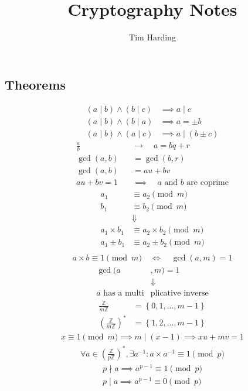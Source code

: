 \documentclass{article}
\title{Cryptography Notes}
\author{Tim Harding}
\newcommand{\curly}[1]{\left\{ #1 \right\}}
\newcommand{\soft}[1]{\left( #1 \right)}
\begin{document}
\begin{multicols*}{2}

\section*{Theorems}

\begin{align*}
    (a \mid b) \wedge (b \mid c) &\implies a \mid c \\
    (a \mid b) \wedge (b \mid a) &\implies a = \pm b \\
    (a \mid b) \wedge (a \mid c) &\implies a \mid (b \pm c)
\end{align*}
\begin{align*}
    \frac{a}{b} \quad &\longrightarrow  \quad a = bq + r \\
    \gcd(a, b) &= \gcd(b, r) \\
    \gcd(a, b) &= au + bv \\
    au + bv = 1 \quad &\implies \quad \text{$a$ and $b$ are coprime}
\end{align*}
\begin{align*}
    a_1 &\equiv a_2 \pmod{m} \\
    b_1 &\equiv b_2 \pmod{m} \\
    &\Downarrow \\
    a_1 \times b_1 &\equiv a_2 \times b_2 \pmod{m} \\
    a_1 \pm b_1 &\equiv a_2 \pm b_2 \pmod{m} \\
\end{align*}
\begin{align*}
    a \times b \equiv 1 \pmod{m} \quad \Leftrightarrow \quad \gcd(a, m) = 1
\end{align*}
\begin{align*}
    \gcd(a&, m) = 1 \\
    &\Downarrow \\
    \text{$a$ has a multi} & \text{plicative inverse}
\end{align*}
\begin{align*}
    \frac{\mathbb{Z}}{m\mathbb{Z}} &= \curly{0, 1, \ldots, m - 1} \\
    \soft{\frac{\mathbb{Z}}{m\mathbb{Z}}}^* &= \curly{1, 2, \ldots, m - 1}
\end{align*}
\begin{align*}
    x \equiv 1 \pmod{m} \implies m \mid (x - 1) \implies xu + mv = 1
\end{align*}
\begin{align*}
    \forall a \in \soft{\frac{\mathbb{Z}}{p\mathbb{Z}}}^*, \exists a^{-1} : a \times a^{-1} \equiv 1 \pmod{p}
\end{align*}
\begin{align*}
    p \nmid a \implies a^{p-1} \equiv 1 \pmod{p} \\
    p \mid a \implies a^{p-1} \equiv 0 \pmod{p}
\end{align*}


\end{multicols*}
\end{document}

